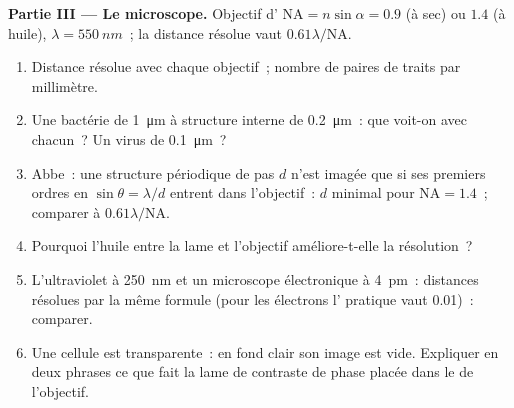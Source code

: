 \begin{problem}
\medskip
\noindent\textbf{Partie III --- Le microscope.}
Objectif d' $\mathrm{NA} = n\sin\alpha = 0.9$ (à sec) ou $1.4$
(à huile), $\lambda = \qty{550}{nm}$~; la distance résolue vaut $0.61\lambda/\mathrm{NA}$.
\begin{enumerate}[resume]
  \item Distance résolue avec chaque objectif~; nombre de paires de traits
        par millimètre.
  \item Une bactérie de \qty{1}{\micro m} à structure interne de
        \qty{0.2}{\micro m}~: que voit-on avec chacun~? Un virus de \qty{0.1}{\micro m}~?
  \item Abbe~: une structure périodique de pas $d$ n'est imagée que si ses
        premiers ordres en $\sin\theta = \lambda/d$ entrent dans l'objectif~: $d$ minimal
        pour $\mathrm{NA} = 1.4$~; comparer à $0.61\lambda/\mathrm{NA}$.
  \item Pourquoi l'huile entre la lame et l'objectif améliore-t-elle la
        résolution~?
  \item L'ultraviolet à \qty{250}{nm} et un microscope électronique à \qty{4}{pm}~:
        distances résolues par la même formule (pour les électrons
        l' pratique vaut \qty{0.01}{})~: comparer.
  \item Une cellule est transparente~: en fond clair son image est vide.
        Expliquer en deux phrases ce que fait la lame de contraste de phase
        placée dans le  de l'objectif.
\end{enumerate}


\end{problem}

